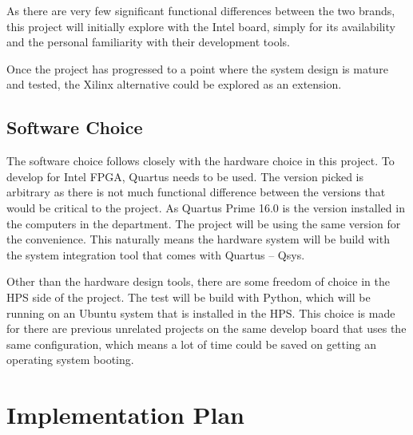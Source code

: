 \documentclass[journal]{IEEEtran}
\begin{document}
As there are very few significant functional differences between the two brands,
this project will initially explore with the Intel board, simply for its
availability and the personal familiarity with their development tools.

Once the project has progressed to a point where the system design is mature and
tested, the Xilinx alternative could be explored as an extension.

\subsection{Software Choice}
The software choice follows closely with the hardware choice in this project.
To develop for Intel FPGA, Quartus needs to be used.
The version picked is arbitrary as there is not much functional difference
between the versions that would be critical to the project.
As Quartus Prime 16.0 is the version installed in the computers in the
department.
The project will be using the same version for the convenience.
This naturally means the hardware system will be build with the system
integration tool that comes with Quartus -- Qsys.

Other than the hardware design tools, there are some freedom of choice in the
HPS side of the project.
The test will be build with Python, which will be running on an Ubuntu system
that is installed in the HPS.
This choice is made for there are previous unrelated projects on the same
develop board that uses the same configuration, which means a lot of time
could be saved on getting an operating system booting.



\section{Implementation Plan}
\end{document}
